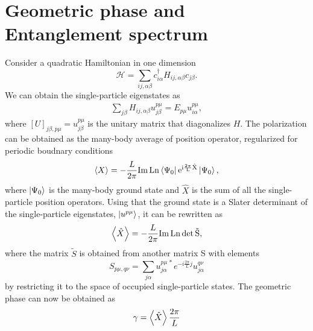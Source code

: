 \documentclass[twocolumn,amsmath,longbibliography,amssymb,superscriptaddress]{revtex4-1}
\begin{document}
\section{Geometric phase and Entanglement spectrum}
Consider a quadratic Hamiltonian in one dimension
\begin{equation}
\mathcal{H} = \sum_{ij,\alpha\beta} c_{i\alpha}^\dagger H_{ij,\alpha \beta}c_{j\beta}.
\end{equation}
We can obtain the single-particle eigenstates as
\begin{align*}
\sum_{j\beta}H_{ij,\alpha\beta} u^{p\mu}_{j\beta} = E_{p\mu} u_{i\alpha}^{p\mu},
\end{align*}
where $[U]_{j\beta,p\mu} = u^{p\mu}_{j\beta}$ is the unitary matrix that diagonalizes $H$. The polarization can be obtained as the many-body average of position operator, regularized for periodic boudnary conditions \cite{Resta1997}
\begin{align*}
\expval{X} = -\frac{L}{2\pi} \rm{ Im\, Ln }\bra{\Psi_0}e^{i \frac{2\pi}{L}\hat{X}}\ket{\Psi_0},
\end{align*}
where $\ket{\Psi_0}$ is the many-body ground state and $\hat{X}$ is the sum of all the single-particle position operators.
Using that the ground state is a Slater determinant of the single-particle eigenstates, $\ket{u^{p\mu}}$, it can be rewritten as
\begin{align*}
\expval{\hat{X}} = -\frac{L}{2\pi} \rm{Im \, Ln}\, {\rm det} \, \tilde{S},
\end{align*}
where the matrix $\tilde{S}$ is obtained from another matrix S with elements
\begin{equation}
S_{p\mu,q\nu} = \sum_{j\alpha}u^{p\mu\, \ast}_{j \alpha} e^{-i\frac{2\pi}{L}j}u^{q\nu}_{j \alpha}
\end{equation}
by restricting it to the space of occupied single-particle states. The geometric phase can now be obtained as
\begin{equation}
\gamma = \expval{\hat{X}}\frac{2\pi}{L}
\end{equation}
\end{document}
